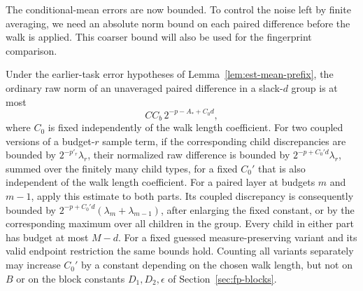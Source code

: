 The conditional-mean errors are now bounded.  To control the noise left
by finite averaging, we need an absolute norm bound on each paired
difference before the walk is applied.  This coarser bound will also be
used for the fingerprint comparison.

\begin{lemma}\label{lem:est-raw-difference}
Under the earlier-task error hypotheses of
Lemma~\ref{lem:est-mean-prefix}, the ordinary raw norm of an unaveraged
paired difference in a slack-$d$ group is at most
\begin{equation}
 C C_b\,2^{-p-A_*+C_0d},
 \label{eq:est-raw-bound}
\end{equation}
where $C_0$ is fixed independently of the walk length coefficient.
For two coupled versions of a budget-$r$ sample term, if the
corresponding child discrepancies are bounded by
$2^{-p'_r}\lambda_r$, their normalized raw difference is bounded by
$2^{-p+C_0'd}\lambda_r$, summed over the finitely many child types,
for a fixed $C_0'$ that is also independent of the walk length
coefficient.
For a paired layer at budgets $m$ and $m-1$, apply this estimate to
both parts. Its coupled discrepancy is consequently bounded by
$2^{-p+C_0'd}(\lambda_m+\lambda_{m-1})$, after enlarging the fixed
constant, or by the corresponding maximum over all children in the
group. Every child in either part has budget at most $M-d$.
For a fixed guessed measure-preserving variant and its valid endpoint
restriction the same bounds hold.  Counting all variants separately may
increase $C_0'$ by a constant depending on the chosen walk length, but
not on $B$ or on the block constants $D_1,D_2,\epsilon$ of
Section~\ref{sec:fp-blocks}.
\end{lemma}
